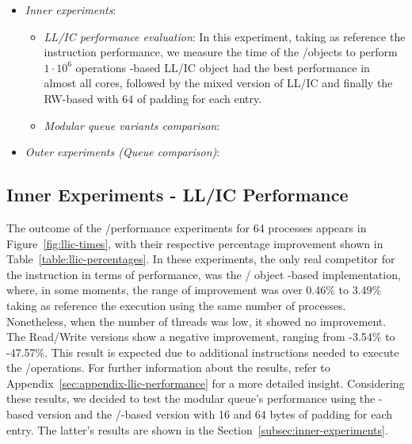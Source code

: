 \begin{itemize}
    \item \textit{Inner experiments}:
    \begin{itemize}
        \item  \textit{LL/IC performance evaluation}: In this experiment, taking as reference the \FAI instruction performance, we measure the time of the \LL/\IC objects to perform \(1\cdot 10^6\) operations \CAS-based LL/IC object had the best performance in almost all cores, followed by the mixed version of LL/IC and finally the RW-based with 64 of padding for each entry.
        \item \textit{Modular queue variants comparison}:
    \end{itemize}
    \item \textit{Outer experiments (Queue comparison)}:
\end{itemize}

\subsection{Inner Experiments - LL/IC Performance}

The outcome of the \LL/\IC performance experiments for 64 processes appears in Figure~\ref{fig:llic-times}, with their respective percentage improvement shown in Table~\ref{table:llic-percentages}. In these experiments, the only real competitor for the \FAI instruction in terms of performance, was the \LL/\IC{} object \CAS-based implementation, where, in some moments, the range of improvement was over 0.46\% to 3.49\% taking as reference the execution using the same number of processes. Nonetheless, when the number of threads was low, it showed  no improvement. The Read/Write versions show a negative improvement, ranging from -3.54\% to -47.57\%. This result is expected due to additional instructions needed to execute the \LL/\IC operations. For further information about the results, refer to Appendix~\ref{sec:appendix-llic-performance} for a more detailed insight. Considering these results, we decided to test the modular queue's performance using the \CAS-based version and the \R/\W-based version with 16 and 64 bytes of padding for each entry. The latter's results are shown in the Section~\ref{subsec:inner-experiments}.

